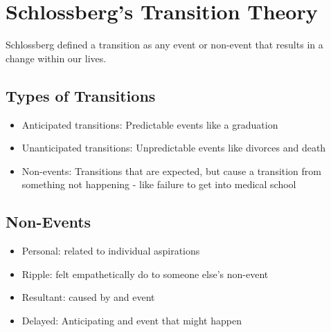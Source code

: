 \documentclass{article}
\begin{document}
\section{Schlossberg's Transition Theory}
Schlossberg defined a transition as any event or non-event that results in a change within our lives.
\subsection{Types of Transitions}
\begin{itemize}
  \item Anticipated transitions: Predictable events like a graduation
  \item Unanticipated transitions: Unpredictable events like divorces and death
  \item Non-events: Transitions that are expected, but cause a transition from something not happening - like failure to get into medical school
\end{itemize}

\subsection{Non-Events}
\begin{itemize}
  \item Personal: related to individual aspirations
  \item Ripple: felt empathetically do to someone else's non-event
  \item Resultant: caused by and event
  \item Delayed: Anticipating and event that might happen
\end{itemize}
\end{document}
